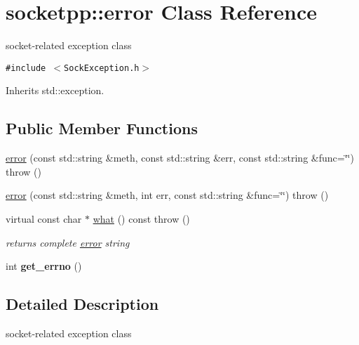 \hypertarget{classsocketpp_1_1error}{
\section{socketpp::error Class Reference}
\label{classsocketpp_1_1error}
}
socket-related exception class  


{\tt \#include $<$SockException.h$>$}

Inherits std::exception.

\subsection*{Public Member Functions}
\begin{CompactItemize}
\item 
\hyperlink{classsocketpp_1_1error_614fef9f326d7bb212771eb20a046290}{error} (const std::string \&meth, const std::string \&err, const std::string \&func=\char`\"{}\char`\"{})  throw ()
\item 
\hyperlink{classsocketpp_1_1error_1287e8ec1ff5f7b18d91ea65c2505ae8}{error} (const std::string \&meth, int err, const std::string \&func=\char`\"{}\char`\"{})  throw ()
\item 
\hypertarget{classsocketpp_1_1error_4b03541ebad2b9d0b73222cd505ea50f}{
virtual const char $\ast$ \hyperlink{classsocketpp_1_1error_4b03541ebad2b9d0b73222cd505ea50f}{what} () const   throw ()}
\label{classsocketpp_1_1error_4b03541ebad2b9d0b73222cd505ea50f}

\begin{CompactList}\small\item\em returns complete \hyperlink{classsocketpp_1_1error}{error} string \item\end{CompactList}\item 
\hypertarget{classsocketpp_1_1error_e1d23816909f2663b5553d232110442b}{
int \textbf{get\_\-errno} ()}
\label{classsocketpp_1_1error_e1d23816909f2663b5553d232110442b}

\end{CompactItemize}


\subsection{Detailed Description}
socket-related exception class 

